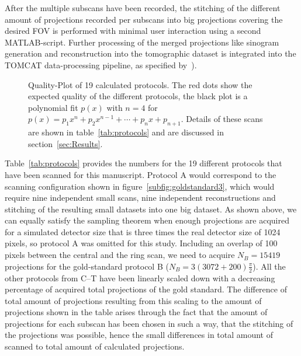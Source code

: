 After the multiple subscans have been recorded, the stitching of the different amount of projections recorded per subscans into big projections covering the desired FOV is performed with minimal user interaction using a second MATLAB-script. Further processing of the merged projections like sinogram generation and reconstruction into the tomographic dataset is integrated into the TOMCAT data-processing pipeline, as specified by~).

\begin{figure}%
	\centering%
	\caption{Quality-Plot of 19 calculated protocols. The red dots show the expected quality of the different protocols, the black plot is a polynomial fit $p(x)$ with $n=4$ for $p(x)=p_{1}x^{n}+p_{2}x^{n-1}+\cdots+p_{n}x+p_{n+1}$. Details of these scans are shown in table~\ref{tab:protocols} and are discussed in section~\ref{sec:Results}.}%
	\label{fig:qualityplot}%
\end{figure}%

Table~\ref{tab:protocols} provides the numbers for the 19 different protocols that have been scanned for this manuscript. Protocol A would correspond to the scanning configuration shown in figure~\ref{subfig:goldstandard3}, which would require nine independent small scans, nine independent reconstructions and stitching of the resulting small datasets into one big dataset. As shown above, we can equally satisfy the sampling theorem when enough projections are acquired for a simulated detector size that is three times the real detector size of 1024 pixels, so protocol A was omitted for this study. Including an overlap of 100 pixels between the central and the ring scan, we need to acquire $N_{B}=15419$ projections for the gold-standard protocol B ($N_{B}=3(3072+200)\frac{\pi}{2}$). All the other protocols from C--T have been linearly scaled down with a decreasing percentage of acquired total projections of the gold standard. The difference of total amount of projections resulting from this scaling to the amount of projections shown in the table arises through the fact that the amount of projections for each subscan has been chosen in such a way, that the stitching of the projections was possible, hence the small differences in total amount of scanned to total amount of calculated projections.

